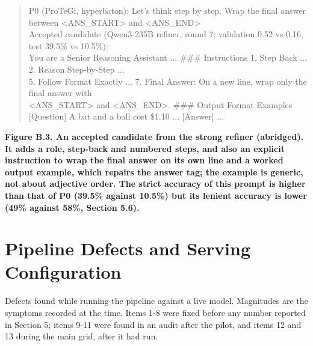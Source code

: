 \documentclass{ieeeaccess}
\begin{document}
\centering
\begin{quote}\ttfamily\small
P0 (ProTeGi, hyperbaton):  Let's think step by step.  Wrap the final answer between <ANS\_\allowbreak{}START> and <ANS\_\allowbreak{}END>\\{}
Accepted candidate (Qwen3-235B refiner, round 7; validation 0.52 vs 0.16, test 39.5\% vs 10.5\%):\\{}
  You are a Senior Reasoning Assistant ... \#\#\# Instructions  1. Step Back ... 2. Reason Step-by-Step ...\\{}
  5. Follow Format Exactly ...  7. Final Answer: On a new line, wrap only the final answer with\\{}
  <ANS\_\allowbreak{}START> and <ANS\_\allowbreak{}END>.   \#\#\# Output Format Examples  [Question] A bat and a ball cost \$1.10 ... [Answer] ...\\{}
\end{quote}
\par\noindent\textbf{Figure B.3. An accepted candidate from the strong refiner (abridged). It adds a role, step-back and numbered steps, and also an explicit instruction to wrap the final answer on its own line and a worked output example, which repairs the answer tag; the example is generic, not about adjective order. The strict accuracy of this prompt is higher than that of P0 (39.5\% against 10.5\%) but its lenient accuracy is lower (49\% against 58\%, Section 5.6).}

\section{Pipeline Defects and Serving Configuration}

Defects found while running the pipeline against a live model. Magnitudes are the symptoms recorded at the time. Items 1-8 were fixed before any number reported in Section 5; items 9-11 were found in an audit after the pilot, and items 12 and 13 during the main grid, after it had run.
\end{document}
